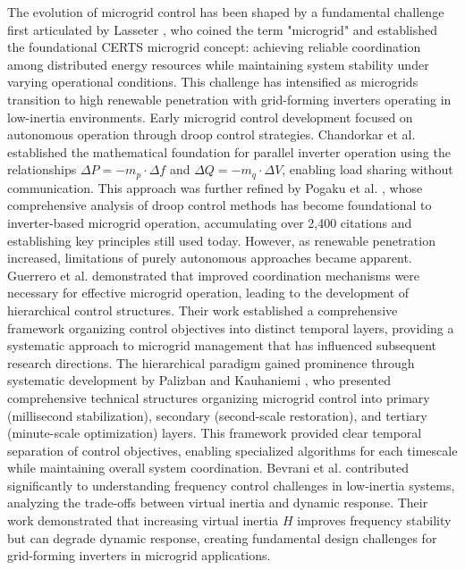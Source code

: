 \documentclass[12pt]{article}
\begin{document}
The evolution of microgrid control has been shaped by a fundamental challenge first articulated by Lasseter \cite{lasseter2002}, who coined the term "microgrid" and established the foundational CERTS microgrid concept: achieving reliable coordination among distributed energy resources while maintaining system stability under varying operational conditions. This challenge has intensified as microgrids transition to high renewable penetration with grid-forming inverters operating in low-inertia environments. Early microgrid control development focused on autonomous operation through droop control strategies. Chandorkar et al. \cite{chandorkar1993} established the mathematical foundation for parallel inverter operation using the relationships $\Delta P = -m_p \cdot \Delta f$ and $\Delta Q = -m_q \cdot \Delta V$, enabling load sharing without communication. This approach was further refined by Pogaku et al. \cite{pogaku2007}, whose comprehensive analysis of droop control methods has become foundational to inverter-based microgrid operation, accumulating over 2,400 citations and establishing key principles still used today.
However, as renewable penetration increased, limitations of purely autonomous approaches became apparent. Guerrero et al. \cite{guerrero2011} demonstrated that improved coordination mechanisms were necessary for effective microgrid operation, leading to the development of hierarchical control structures. Their work established a comprehensive framework organizing control objectives into distinct temporal layers, providing a systematic approach to microgrid management that has influenced subsequent research directions. The hierarchical paradigm gained prominence through systematic development by Palizban and Kauhaniemi \cite{palizban2014,palizban2015}, who presented comprehensive technical structures organizing microgrid control into primary (millisecond stabilization), secondary (second-scale restoration), and tertiary (minute-scale optimization) layers. This framework provided clear temporal separation of control objectives, enabling specialized algorithms for each timescale while maintaining overall system coordination.
Bevrani et al. \cite{bevrani2014} contributed significantly to understanding frequency control challenges in low-inertia systems, analyzing the trade-offs between virtual inertia and dynamic response. Their work demonstrated that increasing virtual inertia $H$ improves frequency stability but can degrade dynamic response, creating fundamental design challenges for grid-forming inverters in microgrid applications.
\end{document}
